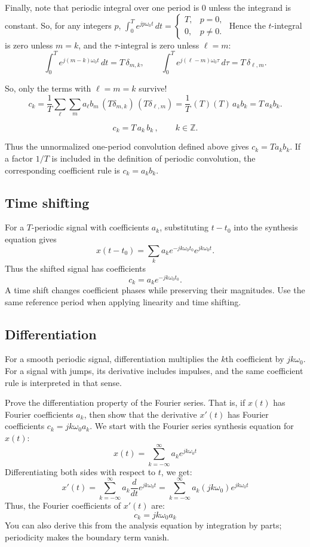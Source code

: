 Finally, note that periodic integral over one period is 0 unless the integrand is constant. So, for any integers $p$,
\(
\int_{0}^{T} e^{jp\omega_0 t}\,dt
=\begin{cases}
T, & p=0,\\
0, & p\neq 0.
\end{cases}
\)
Hence the $t$-integral is zero unless $m=k$, and the $\tau$-integral is zero
unless $\ell=m$:
\[
\int_{0}^{T} e^{j(m-k)\omega_0 t}\,dt = T\,\delta_{m,k},
\qquad
\int_{0}^{T} e^{j(\ell-m)\omega_0 \tau}\,d\tau = T\,\delta_{\ell,m}.
\]

So, only the terms with $\ell=m=k$ survive!
\[
c_k=\frac1T \sum_{\ell}\sum_{m} a_\ell b_m \,(T\delta_{m,k})\,(T\delta_{\ell,m})
=\frac1T \,(T)(T)\, a_k b_k
= T\,a_k b_k .
\]

\[
c_k = T\,a_k\,b_k\,,\qquad k\in\mathbb{Z}.
\]


Thus the unnormalized one-period convolution defined above gives
$c_k=T a_kb_k$. If a factor $1/T$ is included in the definition of periodic
convolution, the corresponding coefficient rule is $c_k=a_kb_k$.


\subsection{Time shifting}
For a $T$-periodic signal with coefficients $a_k$, substituting $t-t_0$
into the synthesis equation gives
\[
x(t-t_0)=\sum_k a_k e^{-jk\omega_0t_0}e^{jk\omega_0t}.
\]
Thus the shifted signal has coefficients
\[
c_k=a_k e^{-jk\omega_0t_0}.
\]
A time shift changes coefficient phases while preserving their magnitudes.
Use the same reference period when applying linearity and time shifting.

\subsection{Differentiation}
For a smooth periodic signal, differentiation multiplies the $k$th
coefficient by $jk\omega_0$. For a signal with jumps, its derivative includes
impulses, and the same coefficient rule is interpreted in that sense.

\begin{popquiz}
Prove the differentiation property of the Fourier series. That is, if $x(t)$ has Fourier coefficients $a_k$, then show that the derivative $x'(t)$ has Fourier coefficients $c_k = j k \omega_0 a_k$.
\popqsplit 
We start with the Fourier series synthesis equation for $x(t)$:
\[
x(t) = \sum_{k=-\infty}^{\infty} a_k e^{j k \omega_0 t}
\]
Differentiating both sides with respect to $t$, we get:
\[
x'(t) = \sum_{k=-\infty}^{\infty} a_k \frac{d}{dt} e^{j k \omega_0 t} = \sum_{k=-\infty}^{\infty} a_k (j k \omega_0) e^{j k \omega_0 t}
\]
Thus, the Fourier coefficients of $x'(t)$ are:
\[
c_k = j k \omega_0 a_k
\]
You can also derive this from the analysis equation by integration by parts; periodicity makes the boundary term vanish.
\end{popquiz}

